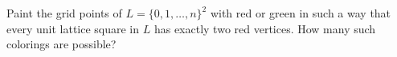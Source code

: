 Paint the grid points of $L=\{0,1,\dots,n\}^2$ with red or green in such a way that every unit lattice square in $L$ has exactly two red vertices. How many such colorings are possible?